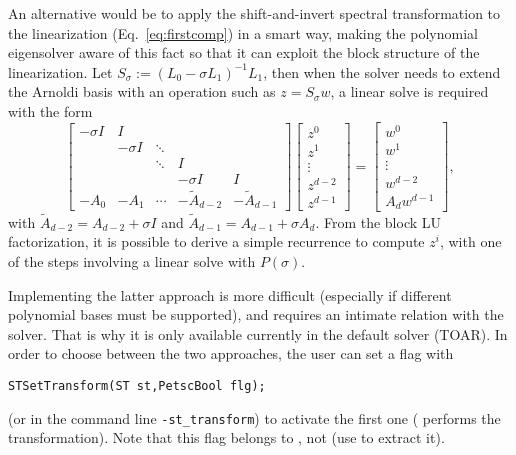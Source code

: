An alternative would be to apply the shift-and-invert spectral transformation to the linearization (Eq.\ \ref{eq:firstcomp}) in a smart way, making the polynomial eigensolver aware of this fact so that it can exploit the block structure of the linearization. 
Let $S_\sigma:=(L_0-\sigma L_1)^{-1}L_1$, then when the solver needs to extend the Arnoldi basis with an operation such as $z=S_\sigma w$, a linear solve is required with the form
\begin{equation}
\label{eq:sinvpeplin}
\begin{bmatrix}
  -\sigma I  & I \\
  & -\sigma I & \ddots \\
  & & \ddots & I \\
  & & & -\sigma I & I \\
  -A_0 & -A_1 & \cdots  & -\tilde{A}_{d-2} & -\tilde{A}_{d-1}
\end{bmatrix}
\begin{bmatrix}
  z^0\\z^1\\\vdots\\z^{d-2}\\z^{d-1}
\end{bmatrix}
  =
\begin{bmatrix}
  w^0\\w^1\\\vdots\\w^{d-2}\\A_dw^{d-1}
\end{bmatrix},
\end{equation}
with $\tilde{A}_{d-2}=A_{d-2}+\sigma I$ and $\tilde{A}_{d-1}=A_{d-1}+\sigma A_d$.
From the block LU factorization, it is possible to derive a simple recurrence to compute $z^i$, with one of the steps involving a linear solve with $P(\sigma)$.

Implementing the latter approach is more difficult (especially if different polynomial bases must be supported), and requires an intimate relation with the  solver. That is why it is only available currently in the default solver (TOAR). In order to choose between the two approaches, the user can set a flag with
	\begin{Verbatim}[fontsize=\small]
	STSetTransform(ST st,PetscBool flg);
	\end{Verbatim}
(or in the command line \Verb!-st_transform!) to activate the first one ( performs the transformation). Note that this flag belongs to , not  (use  to extract it).

